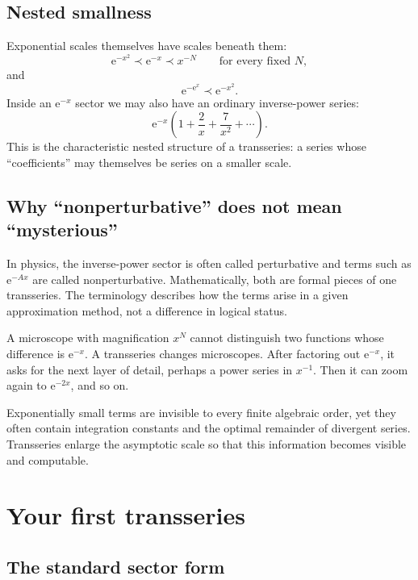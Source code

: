 \documentclass[11pt,oneside]{book}
\theoremstyle{definition}
\theoremstyle{remark}
\newcommand{\e}{\mathrm{e}}
\newcommand{\precdom}{\prec}
\begin{document}
\section{Nested smallness}

Exponential scales themselves have scales beneath them:
\[
  \e^{-x^2}\precdom\e^{-x}\precdom x^{-N}
  \qquad\text{for every fixed }N,
\]
and
\[
  \e^{-\e^x}\precdom\e^{-x^2}.
\]
Inside an $\e^{-x}$ sector we may also have an ordinary inverse-power series:
\[
  \e^{-x}\left(1+\frac{2}{x}+\frac{7}{x^2}+\cdots\right).
\]
This is the characteristic nested structure of a transseries: a series whose
``coefficients'' may themselves be series on a smaller scale.

\section{Why ``nonperturbative'' does not mean ``mysterious''}

In physics, the inverse-power sector is often called perturbative and terms such
as $\e^{-Ax}$ are called nonperturbative. Mathematically, both are formal pieces
of one transseries. The terminology describes how the terms arise in a given
approximation method, not a difference in logical status.

\begin{intuitionbox}
A microscope with magnification $x^N$ cannot distinguish two functions whose
difference is $\e^{-x}$. A transseries changes microscopes. After factoring out
$\e^{-x}$, it asks for the next layer of detail, perhaps a power series in
$x^{-1}$. Then it can zoom again to $\e^{-2x}$, and so on.
\end{intuitionbox}

\begin{summarybox}
Exponentially small terms are invisible to every finite algebraic order, yet
they often contain integration constants and the optimal remainder of divergent
series. Transseries enlarge the asymptotic scale so that this information becomes
visible and computable.
\end{summarybox}

\chapter{Your first transseries}
\label{ch:first-transseries}

\section{The standard sector form}
\end{document}
